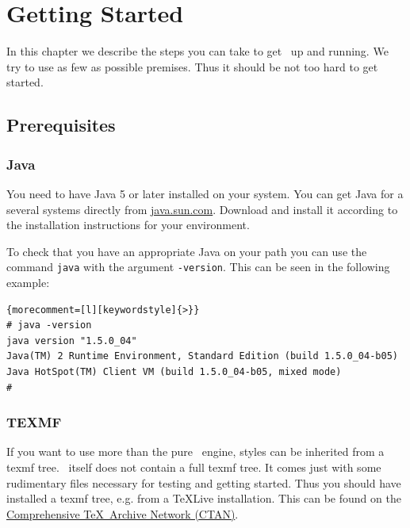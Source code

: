 
\chapter{Getting Started}

In this chapter we describe the steps you can take to get \ExBib\ up
and running. We try to use as few as possible premises. Thus it should
be not too hard to get started.

\section{Prerequisites}

\subsection{Java}%

You need to have Java 5 or later installed on your
system. You can get Java for a several systems directly from
\url{java.sun.com}. Download and install it according to the
installation instructions for your environment.

To check that you have an appropriate Java on your path you can use
the command \texttt{java} with the argument \texttt{-version}. This
can be seen in the following example:

%
\begin{lstlisting}{morecomment=[l][keywordstyle]{>}}
# java -version
java version "1.5.0_04"
Java(TM) 2 Runtime Environment, Standard Edition (build 1.5.0_04-b05)
Java HotSpot(TM) Client VM (build 1.5.0_04-b05, mixed mode)
#
\end{lstlisting}


\subsection{TEXMF}%

If you want to use more than the pure \ExBib\ engine, styles can be
inherited from a texmf tree. \ExBib\ itself does not
contain a full texmf tree. It comes just with some rudimentary files
necessary for testing and getting started. Thus you should have
installed a texmf tree, e.g. from a \TeX Live
installation. This can be found on the
\href{http://www.ctan.org}{Comprehensive \TeX\ Archive Network
  (CTAN)}.

